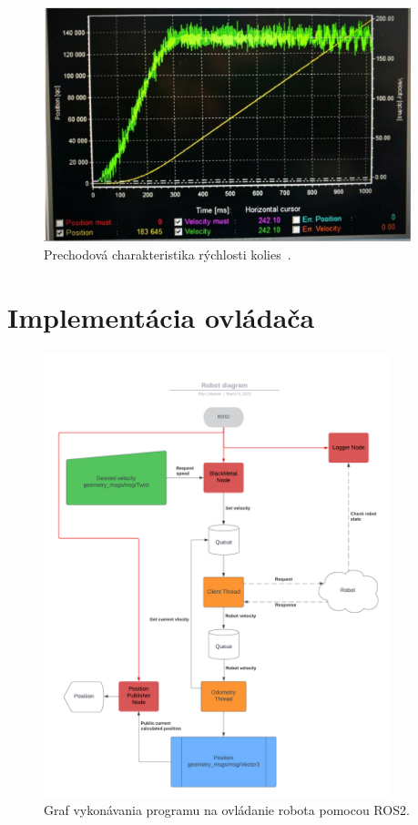 \begin{figure}[!htbp]
	\begin{center}
		\includegraphics[width=0.95\textwidth]{img/robotSpeedChar.png}
	\end{center}
	\caption{Prechodová charakteristika rýchlosti kolies~\cite{timovyProjekt}. }
	\label{fig:prechChar}
\end{figure}

\clearpage

\section{Implementácia ovládača}
\label{sec:program}

\begin{figure}[!htbp]
	\begin{center}
		\includegraphics[width=0.9\textwidth]{img/BlackMetal_flowchart.png}
	\end{center}
	\caption{Graf vykonávania programu na ovládanie robota pomocou ROS2.}
	\label{fig:flowchart}
\end{figure}

